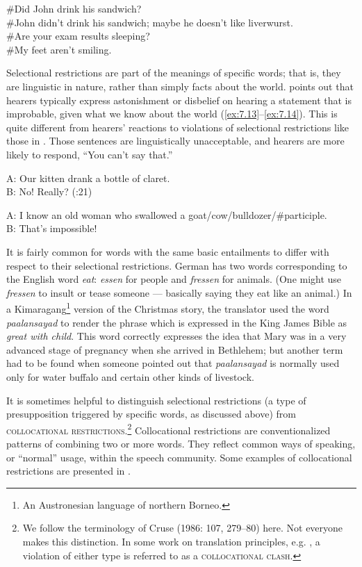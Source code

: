 \ea \label{ex:7.12}
\ea \#Did John drink his sandwich?\\
\ex \#John didn’t drink his sandwich; maybe he doesn’t like liverwurst.\\
\ex \#Are your exam results sleeping?\\
\ex \#My feet aren’t smiling.
                       \z
\z

Selectional restrictions are part of the meanings of specific words; that is, they are linguistic in nature, rather than simply facts about the world. \citet[21]{Cruse1986} points out that hearers typically express astonishment or disbelief on hearing a statement that is improbable, given what we know about the world (\ref{ex:7.13}--\ref{ex:7.14}). This is quite different from hearers’ reactions to violations of selectional restrictions like those in . Those sentences are linguistically unacceptable, and hearers are more likely to respond, “You can’t say that.”

\ea \label{ex:7.13}
A: Our kitten drank a bottle of claret.\\
B: No! Really?  (\citealt{Cruse1986}:21)
\z

\ea \label{ex:7.14}
A: I know an old woman who swallowed a goat/cow/bulldozer/\#participle.\\
B: That’s impossible!
\z


It is fairly common for words with the same basic entailments to differ with respect to their selectional restrictions. German has two words corresponding to the English word \textit{eat}: \textit{essen} for people and \textit{fressen} for animals. (One might use \textit{fressen} to insult or tease someone — basically saying they eat like an animal.) In a Kimaragang\footnote{An Austronesian language of northern Borneo.} version of the Christmas story, the translator used the word \textit{paalansayad} to render the phrase which is expressed in the King James Bible as \textit{great with child}. This word correctly expresses the idea that Mary was in a very advanced stage of pregnancy when she arrived in Bethlehem; but another term had to be found when someone pointed out that \textit{paalansayad} is normally used only for water buffalo and certain other kinds of livestock.



It is sometimes helpful to distinguish selectional restrictions (a type of presupposition triggered by specific words, as discussed above) from \textsc{collocational restrictions}.\footnote{We follow the terminology of Cruse (1986: 107, 279–80) here. Not everyone makes this distinction. In some work on translation principles, e.g. \citet{BeekmanCallow1974}, a violation of either type is referred to as a \textsc{collocational clash}.} Collocational restrictions are conventionalized patterns of combining two or more words. They reflect common ways of speaking, or “normal” usage, within the speech community. Some examples of collocational restrictions are presented in .


